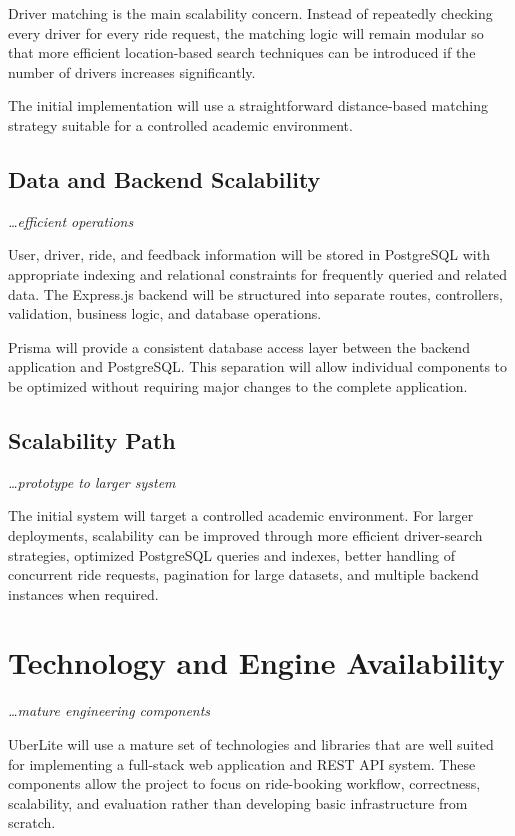\documentclass[11pt,a4paper]{article}
\newcommand{\BvrHint}[1]{%
  {\normalfont\normalsize\itshape\hfill #1}}
\begin{document}
Driver matching is the main scalability concern. Instead of
repeatedly checking every driver for every ride request, the matching
logic will remain modular so that more efficient location-based
search techniques can be introduced if the number of drivers
increases significantly.

The initial implementation will use a straightforward distance-based
matching strategy suitable for a controlled academic environment.


\subsection{Data and Backend Scalability}
\BvrHint{\ldots efficient operations}

User, driver, ride, and feedback information will be stored in
PostgreSQL with appropriate indexing and relational constraints for
frequently queried and related data. The Express.js backend will be
structured into separate routes, controllers, validation, business
logic, and database operations.

Prisma will provide a consistent database access layer between the
backend application and PostgreSQL. This separation will allow
individual components to be optimized without requiring major
changes to the complete application.


\subsection{Scalability Path}
\BvrHint{\ldots prototype to larger system}

The initial system will target a controlled academic environment.
For larger deployments, scalability can be improved through more
efficient driver-search strategies, optimized PostgreSQL queries
and indexes, better handling of concurrent ride requests,
pagination for large datasets, and multiple backend instances when
required.


\section{Technology and Engine Availability}
\BvrHint{\ldots mature engineering components}

UberLite will use a mature set of technologies and libraries that
are well suited for implementing a full-stack web application and
REST API system. These components allow the project to focus on
ride-booking workflow, correctness, scalability, and evaluation
rather than developing basic infrastructure from scratch.
\end{document}
